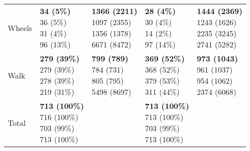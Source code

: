 \begin{table}
\begin{center}
\begin{small}
\begin{tabular}{lllll}
Wheels      &  \makecell[l]{\textbf{34 (5\%)} \\36 (5\%) \\31 (4\%) \\96 (13\%) \\}      &  \makecell[l]{\textbf{1366 (2211)} \\1097 (2355) \\1356 (1378) \\6671 (8472) \\}      &  \makecell[l]{\textbf{28 (4\%)} \\30 (4\%) \\14 (2\%) \\97 (14\%) \\}      &  \makecell[l]{\textbf{1444 (2369)} \\1243 (1626) \\2235 (3245) \\2741 (5282) \\} \\ \cline{2-5}
Walk      &  \makecell[l]{\textbf{279 (39\%)} \\279 (39\%) \\278 (39\%) \\219 (31\%) \\}      &  \makecell[l]{\textbf{799 (789)} \\784 (731) \\805 (795) \\5498 (8697) \\}      &  \makecell[l]{\textbf{369 (52\%)} \\368 (52\%) \\379 (53\%) \\311 (44\%) \\}      &  \makecell[l]{\textbf{973 (1043)} \\961 (1037) \\954 (1062) \\2374 (6068) \\} \\ \cline{2-5}
      Total       & \makecell[l]{\textbf{713 (100\%)} \\716 (100\%) \\703 (99\%) \\713 (100\%) \\} &       & \makecell[l]{\textbf{713 (100\%)} \\713 (100\%) \\703 (99\%) \\713 (100\%) \\} & \\ 


\end{tabular}
\end{small}
\end{center}
\end{table}
